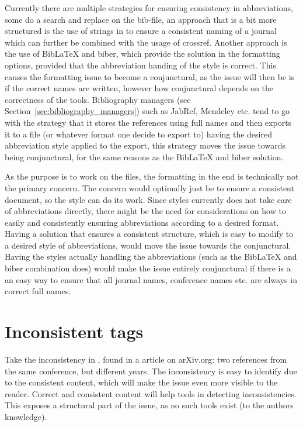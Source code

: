 Currently there are multiple strategies for ensuring consistency in
abbreviations, some do a search and replace on the bib-file, an
approach that is a bit more structured is the use of strings in
{\bibtex} to ensure a consistent naming of a journal which can further
be combined with the usage of crossref.  Another approach is the use
of Bib{\LaTeX} and biber, which provide the solution in the formatting
options\cite{koppensteiner2011abbreviate}, provided that the
abbreviation handing of the style is correct.  This causes the
formatting issue to become a conjunctural, as the issue will then be
is if the correct names are written, however how conjunctural depends
on the correctness of the tools.  Bibliography managers (see
Section~\ref{sec:bibliography_managers}) such as JabRef, Mendeley
etc. tend to go with the strategy that it stores the references using
full names and then exports it to a {\bibtex} file (or whatever format
one decide to export to) having the desired abbreviation style applied
to the export, this strategy moves the issue towards being
conjunctural, for the same reasons as the Bib{\LaTeX} and biber
solution.

As the purpose is to work on the {\bibtex} files, the formatting in
the end is technically not the primary concern.  The concern would
optimally just be to ensure a consistent document, so the style can do
its work.  Since {\bibtex} styles currently does not take care of
abbreviations directly, there might be the need for considerations on
how to easily and consistently ensuring abbreviations according to a
desired format.  Having a solution that ensures a consistent
structure, which is easy to modify to a desired style of
abbreviations, would move the issue towards the conjunctural.  Having
the styles actually handling the abbreviations (such as the
Bib{\LaTeX} and biber combination does) would make the issue entirely
conjunctural if there is a an easy way to ensure that all journal
names, conference names etc. are always in correct full names.

\section{Inconsistent tags}
\label{sec:problems_inconsistent_tags}

Take the inconsistency in , found in a
article on arXiv.org: two references from the same conference, but
different years.  The inconsistency is easy to identify due to the
consistent content, which will make the issue even more visible to the
reader.  Correct and consistent content will help tools in detecting
inconsistencies.  This exposes a structural part of the issue, as no
such tools exist (to the authors knowledge).

